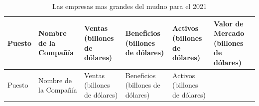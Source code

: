 \documentclass[
  jou,
  floatsintext,
  longtable,
  a4paper,
  nolmodern,
  notxfonts,
  notimes,
  12pt,
  colorlinks=true,linkcolor=blue,citecolor=blue,urlcolor=blue]{apa7}
\begin{document}
\begin{ThreePartTable}

\begin{longtable}[]{@{}
  >{\raggedright\arraybackslash}p{}
  >{\raggedright\arraybackslash}p{}
  >{\raggedright\arraybackslash}p{}
  >{\raggedright\arraybackslash}p{}
  >{\raggedright\arraybackslash}p{}
  >{\raggedright\arraybackslash}p{}@{}}
\caption{Las empresas mas grandes del mudno para el
2021}\label{tbl-1}\tabularnewline
\toprule\noalign{}
\begin{minipage}[b]{\linewidth}\raggedright
Puesto
\end{minipage} & \begin{minipage}[b]{\linewidth}\raggedright
Nombre de la Compañía
\end{minipage} & \begin{minipage}[b]{\linewidth}\raggedright
Ventas (billones de dólares)
\end{minipage} & \begin{minipage}[b]{\linewidth}\raggedright
Beneficios (billones de dólares)
\end{minipage} & \begin{minipage}[b]{\linewidth}\raggedright
Activos (billones de dólares)
\end{minipage} & \begin{minipage}[b]{\linewidth}\raggedright
Valor de Mercado (billones de dólares)
\end{minipage} \\
\midrule\noalign{}
\endfirsthead
\toprule\noalign{}
\begin{minipage}[b]{\linewidth}\raggedright
Puesto
\end{minipage} & \begin{minipage}[b]{\linewidth}\raggedright
Nombre de la Compañía
\end{minipage} & \begin{minipage}[b]{\linewidth}\raggedright
Ventas (billones de dólares)
\end{minipage} & \begin{minipage}[b]{\linewidth}\raggedright
Beneficios (billones de dólares)
\end{minipage} & \begin{minipage}[b]{\linewidth}\raggedright
Activos (billones de dólares)

\end{minipage}
\end{longtable}
\end{ThreePartTable}
\end{document}
